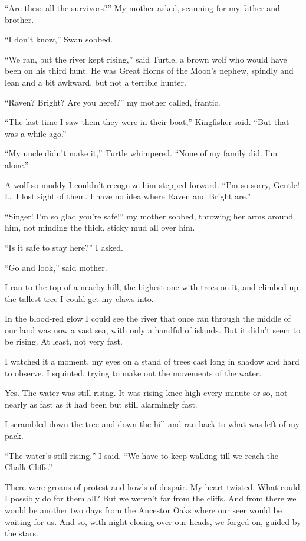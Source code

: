 ``Are these all the survivors?'' My mother asked, scanning for my father and brother.

``I don't know,'' Swan sobbed.

``We ran, but the river kept rising,'' said Turtle, a brown wolf who would have been on his third hunt. He was Great Horns of the Moon's nephew, spindly and lean and a bit awkward, but not a terrible hunter.

``Raven? Bright? Are you here!?'' my mother called, frantic.

``The last time I saw them they were in their boat,'' Kingfisher said. ``But that was a while ago.''

``My uncle didn't make it,'' Turtle whimpered. ``None of my family did. I'm alone.''

A wolf so muddy I couldn't recognize him stepped forward. ``I'm so sorry, Gentle! I\ldots{} I lost sight of them. I have no idea where Raven and Bright are.''

``Singer! I'm so glad you're safe!'' my mother sobbed, throwing her arms around him, not minding the thick, sticky mud all over him.

``Is it safe to stay here?'' I asked.

``Go and look,'' said mother.

I ran to the top of a nearby hill, the highest one with trees on it, and climbed up the tallest tree I could get my claws into.

In the blood-red glow I could see the river that once ran through the middle of our land was now a vast sea, with only a handful of islands. But it didn't seem to be rising. At least, not very fast.

I watched it a moment, my eyes on a stand of trees cast long in shadow and hard to observe. I squinted, trying to make out the movements of the water.

Yes. The water was still rising. It was rising knee-high every minute or so, not nearly as fast as it had been but still alarmingly fast.

I scrambled down the tree and down the hill and ran back to what was left of my pack.

``The water's still rising,'' I said. ``We have to keep walking till we reach the Chalk Cliffs.''

There were groans of protest and howls of despair. My heart twisted. What could I possibly do for them all? But we weren't far from the cliffs. And from there we would be another two days from the Ancestor Oaks where our seer would be waiting for us. And so, with night closing over our heads, we forged on, guided by the stars.

